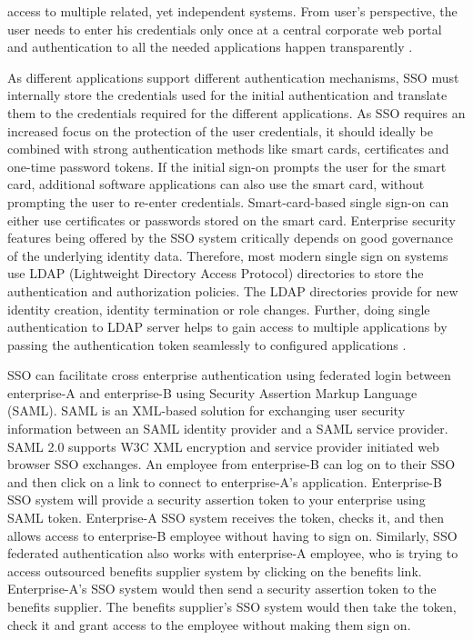 \begin{multicols}{2}
access to multiple related, yet independent systems. From user's perspective, the user needs to enter his credentials only once at a central corporate web portal and authentication to all the needed applications happen transparently \cite{chap2-key19}.

As different applications support different authentication mechanisms, SSO must internally store the credentials used for the initial authentication and translate them to the credentials required for the different applications. As SSO requires an increased focus on the protection of the user credentials, it should ideally be combined with strong authentication methods like smart cards, certificates and one-time password tokens. If the initial sign-on prompts the user for the smart card, additional software applications can also use the smart card, without prompting the user to re-enter credentials. Smart-card-based single sign-on can either use certificates or passwords stored on the smart card. Enterprise security features being offered by the SSO system critically depends on good governance of the underlying identity data. Therefore, most modern single sign on systems use LDAP (Lightweight Directory Access Protocol) directories to store the authentication and authorization policies. The LDAP directories provide for new identity creation, identity termination or role changes. Further, doing single authentication to LDAP server helps to gain access to multiple applications by passing the authentication token seamlessly to configured applications \cite{chap2-key20}.

SSO can facilitate cross enterprise authentication using federated login between enterprise-A and enterprise-B using Security Assertion Markup Language (SAML). SAML is an XML-based solution for exchanging user security information between an SAML identity provider and a SAML service provider. SAML 2.0 supports W3C XML encryption and service provider initiated web browser SSO exchanges. An employee from enterprise-B can log on to their SSO and then click on a link to connect to enterprise-A's application. Enterprise-B SSO system will provide a security assertion token to your enterprise using SAML token. Enterprise-A SSO system receives the token, checks it, and then allows access to enterprise-B employee without having to sign on. Similarly, SSO federated authentication also works with enterprise-A employee, who is trying to access outsourced benefits supplier system by clicking on the benefits link. Enterprise-A's SSO system would then send a security assertion token to the benefits supplier. The benefits supplier's SSO system would then take the token, check it and grant access to the employee without making them sign on.


\end{multicols}
